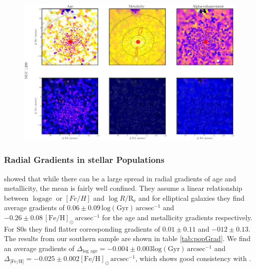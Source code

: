 		\begin{figure}
			\centering
			\includegraphics[height=0.31\textheight]{chapter4/muse/pop2.png}
		\end{figure}


		\subsubsection{Radial Gradients in stellar Populations}
			\label{subsubsec:popGrad}

			\citet{Koleva2011} showed that while there can be a large spread in radial gradients of age and metallicity, the mean is fairly well confined. They assume a linear relationship between $\log \text{age}$ or $[Fe/H]$ and $\log R/\mathrm{R_e}$ and for elliptical galaxies they find average gradients of $0.06\pm0.09 \, \mathrm{log(Gyr) \, arcsec^{-1}}$ and $-0.26\pm0.08 \, \mathrm{[Fe/H]_\odot \, arcsec^{-1}}$ for the age and metallicity gradients respectively. For S0s they find flatter corresponding gradients of $0.01\pm0.11$ and $-012\pm0.13$. The results from our southern sample are shown in table \ref{tab:popGrad}. We find an average gradients of $\Delta_\text{log age} = -0.004\pm0.003 \mathrm{log(Gyr) \, arcsec^{-1}}$ and $\Delta_\text{[Fe/H]} = -0.025\pm0.002 \mathrm{[Fe/H]_\odot \, arcsec^{-1}}$, which shows good consistency with \citet{Koleva2011}.

